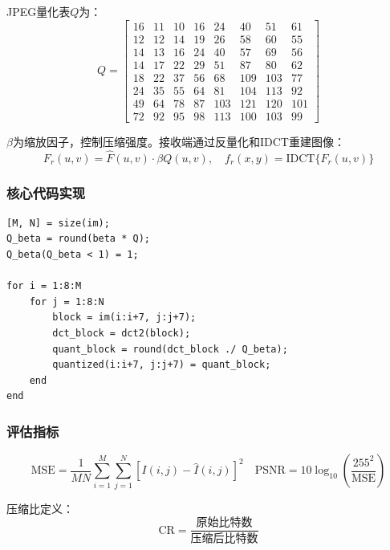 \documentclass[12pt, a4paper]{article}
\begin{document}
JPEG量化表$Q$为：
\begin{equation}
Q = \begin{bmatrix}
16 & 11 & 10 & 16 & 24 & 40 & 51 & 61\\
12 & 12 & 14 & 19 & 26 & 58 & 60 & 55\\
14 & 13 & 16 & 24 & 40 & 57 & 69 & 56\\
14 & 17 & 22 & 29 & 51 & 87 & 80 & 62\\
18 & 22 & 37 & 56 & 68 & 109 & 103 & 77\\
24 & 35 & 55 & 64 & 81 & 104 & 113 & 92\\
49 & 64 & 78 & 87 & 103 & 121 & 120 & 101\\
72 & 92 & 95 & 98 & 113 & 100 & 103 & 99
\end{bmatrix}
\label{eq:qtable}
\end{equation}

$\beta$为缩放因子，控制压缩强度。接收端通过反量化和IDCT重建图像：
\begin{equation}
F_r(u,v) = \hat{F}(u,v) \cdot \beta Q(u,v), \quad f_r(x,y) = \text{IDCT}\{F_r(u,v)\}
\label{eq:recon}
\end{equation}

\subsubsection{核心代码实现}

\begin{lstlisting}[caption=DCT分块量化核心代码]
[M, N] = size(im);
Q_beta = round(beta * Q);
Q_beta(Q_beta < 1) = 1;

for i = 1:8:M
    for j = 1:8:N
        block = im(i:i+7, j:j+7);
        dct_block = dct2(block);
        quant_block = round(dct_block ./ Q_beta);
        quantized(i:i+7, j:j+7) = quant_block;
    end
end
\end{lstlisting}

\subsubsection{评估指标}

\begin{equation}
\text{MSE} = \frac{1}{MN}\sum_{i=1}^{M}\sum_{j=1}^{N}[I(i,j)-\hat{I}(i,j)]^2
\quad
\text{PSNR} = 10\log_{10}\left(\frac{255^2}{\text{MSE}}\right)
\label{eq:metrics}
\end{equation}

压缩比定义：
\begin{equation}
\text{CR} = \frac{\text{原始比特数}}{\text{压缩后比特数}}
\label{eq:cr}
\end{equation}
\end{document}
